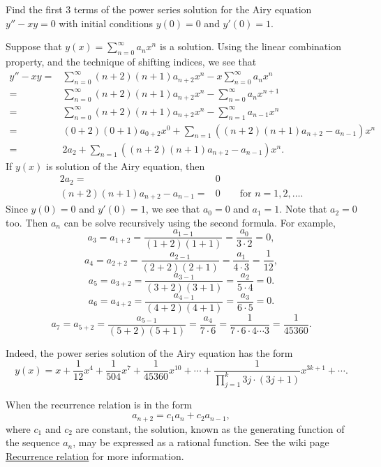 \begin{example}
  Find the first 3 terms of the power series solution for the Airy equation $y''-xy=0$ with initial conditions $y(0)=0$ and $y'(0)=1$.
\end{example}
\begin{solution}
  Suppose that $y(x)=\sum\limits_{n=0}^\infty a_nx^n$ is a solution.  Using the linear combination property, and the technique of shifting indices, we see that
  \[
  \begin{aligned}
    y''-xy=&\sum_{n=0}^\infty (n+2)(n+1)a_{n+2}x^n - x\sum\limits_{n=0}^\infty a_nx^n\\
    =&\sum_{n=0}^\infty (n+2)(n+1)a_{n+2}x^n - \sum_{n=0}^\infty a_n x^{n+1}\\
    =&\sum_{n=0}^\infty (n+2)(n+1)a_{n+2}x^n - \sum_{n=1}^\infty a_{n-1}x^n\\
    =& (0+2)(0+1)a_{0+2}x^0+\sum_{n=1}((n+2)(n+1)a_{n+2}-a_{n-1})x^n\\
    =&2a_2 + \sum_{n=1}((n+2)(n+1)a_{n+2}-a_{n-1})x^n.
  \end{aligned}  
  \]
  If $y(x)$ is solution of the Airy equation, then
  \[
    \begin{aligned}
      2a_2=&0\\  
      (n+2)(n+1)a_{n+2}-a_{n-1}=&0 \qquad \text{for } n=1, 2, \dots.
    \end{aligned}
  \]
  Since $y(0)=0$ and $y'(0)=1$, we see that $a_0=0$ and $a_1=1$. Note that $a_2=0$ too. Then $a_n$ can be solve recursively using the second formula. For example, 
  \[a_3=a_{1+2}=\frac{a_{1-1}}{(1+2)(1+1)}= \frac{a_0}{3\cdot 2}=0,\]
  \[a_4=a_{2+2}=\frac{a_{2-1}}{(2+2)(2+1)}= \frac{a_1}{4\cdot 3}=\frac{1}{12},\]
  \[a_5=a_{3+2}=\frac{a_{3-1}}{(3+2)(3+1)}= \frac{a_2}{5\cdot 4}=0.\]
  \[a_6=a_{4+2}=\frac{a_{4-1}}{(4+2)(4+1)}= \frac{a_3}{6\cdot 5}=0.\]
  \[a_7=a_{5+2}=\frac{a_{5-1}}{(5+2)(5+1)}= \frac{a_4}{7\cdot 6}=\frac{1}{7\cdot 6\cdot 4\cdots 3}=\frac{1}{45360}.\]

  Indeed, the power series solution of the Airy equation has the form
  \[y(x)=x+\frac{1}{12}x^4+\frac{1}{504}x^7+\frac{1}{45360}x^{10}+\cdots + \frac{1}{\prod\limits_{j=1}^k3 j\cdot(3j+1)}x^{3k+1}+\cdots.\]
\end{solution}

\begin{remark}
  When the recurrence relation is in the form
  \[a_{n+2}=c_1a_{n}+c_2a_{n-1},\]
  where $c_1$ and $c_2$ are constant, the solution, known as the generating function of the sequence $a_n$, may be expressed as a rational function. See the wiki page \href{https://en.wikipedia.org/wiki/Recurrence_relation}{Recurrence relation} for more information.
\end{remark}

